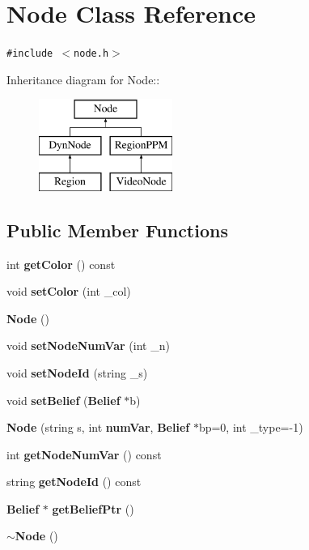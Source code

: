 \section{Node Class Reference}
\label{classNode}
{\tt \#include $<$node.h$>$}

Inheritance diagram for Node::\begin{figure}[H]
\begin{center}
\leavevmode
\includegraphics[height=3cm]{classNode}
\end{center}
\end{figure}
\subsection*{Public Member Functions}
\begin{CompactItemize}
\item 
int {\bf getColor} () const
\item 
void {\bf setColor} (int \_\-col)
\item 
{\bf Node} ()
\item 
void {\bf setNodeNumVar} (int \_\-n)
\item 
void {\bf setNodeId} (string \_\-s)
\item 
void {\bf setBelief} ({\bf Belief} $\ast$b)
\item 
{\bf Node} (string s, int {\bf numVar}, {\bf Belief} $\ast$bp=0, int \_\-type=-1)
\item 
int {\bf getNodeNumVar} () const
\item 
string {\bf getNodeId} () const
\item 
{\bf Belief} $\ast$ {\bf getBeliefPtr} ()
\item 
{\bf $\sim$Node} ()
\end{CompactItemize}
